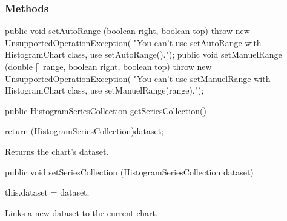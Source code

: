 \subsubsection*{Methods}

\begin{code}
\begin{hide}
   public void setAutoRange (boolean right, boolean top)  {
         throw new UnsupportedOperationException(
            "You can't use setAutoRange with HistogramChart class, use setAutoRange().");
   }
   public void setManuelRange (double [] range, boolean right, boolean top) {
         throw new UnsupportedOperationException(
            "You can't use setManuelRange with HistogramChart class, use setManuelRange(range).");
   }
\end{hide}

   public HistogramSeriesCollection getSeriesCollection() \begin{hide} {
      return (HistogramSeriesCollection)dataset;
   }\end{hide}
\end{code}
\begin{tabb}
   Returns the chart's dataset.
\end{tabb}
\begin{htmlonly}
\end{htmlonly}
\begin{code}

   public void setSeriesCollection (HistogramSeriesCollection dataset) \begin{hide} {
      this.dataset = dataset;
   }\end{hide}
\end{code}
\begin{tabb}
   Links a new dataset to the current chart.
\end{tabb}
\begin{htmlonly}
\end{htmlonly}
